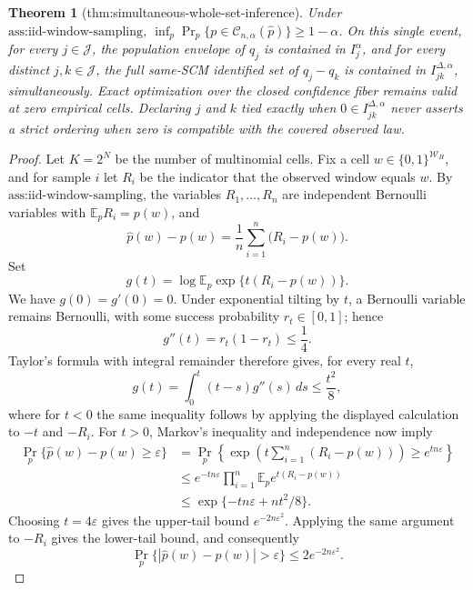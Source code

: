 \documentclass{article}
\newtheorem{theorem}{Theorem}
\begin{document}
\begin{theorem}[thm:simultaneous-whole-set-inference]\label{thm:simultaneous-whole-set-inference}
Under \(\text{ass:iid-window-sampling}\), \(\inf_p\Pr_p\{p\in\mathcal C_{n,\alpha}(\widehat p)\}\ge1-\alpha\). On this single event, for every \(j\in\mathcal J\), the population envelope of \(q_j\) is contained in \(I_j^{\alpha}\), and for every distinct \(j,k\in\mathcal J\), the full same-SCM identified set of \(q_j-q_k\) is contained in \(I_{jk}^{\Delta,\alpha}\), simultaneously. Exact optimization over the closed confidence fiber remains valid at zero empirical cells. Declaring \(j\) and \(k\) tied exactly when \(0\in I_{jk}^{\Delta,\alpha}\) never asserts a strict ordering when zero is compatible with the covered observed law.
\end{theorem}
\begin{proof}
Let \(K=2^N\) be the number of multinomial cells.  Fix a cell \(w\in\{0,1\}^{\mathcal W_H}\), and for sample \(i\) let \(R_i\) be the indicator that the observed window equals \(w\).  By \(\text{ass:iid-window-sampling}\), the variables \(R_1,\ldots,R_n\) are independent Bernoulli variables with \(\mathbb E_p R_i=p(w)\), and
\[
\widehat p(w)-p(w)=\frac1n\sum_{i=1}^n\bigl(R_i-p(w)\bigr).
\]
Set
\[
g(t)=\log\mathbb E_p\exp\{t(R_i-p(w))\}.
\]
We have \(g(0)=g'(0)=0\).  Under exponential tilting by \(t\), a Bernoulli variable remains Bernoulli, with some success probability \(r_t\in[0,1]\); hence
\[
g''(t)=r_t(1-r_t)\le\frac14.
\]
Taylor's formula with integral remainder therefore gives, for every real \(t\),
\[
g(t)=\int_0^t(t-s)g''(s)\,ds\le\frac{t^2}{8},
\]
where for \(t<0\) the same inequality follows by applying the displayed calculation to \(-t\) and \(-R_i\).  For \(t>0\), Markov's inequality and independence now imply
\[
\begin{aligned}
\Pr_p\{\widehat p(w)-p(w)\ge\varepsilon\}
&=\Pr_p\!\left\{\exp\!\left(t\sum_{i=1}^n(R_i-p(w))\right)
       \ge e^{tn\varepsilon}\right\}\\
&\le e^{-tn\varepsilon}\prod_{i=1}^n
       \mathbb E_p e^{t(R_i-p(w))}\\
&\le\exp\{-tn\varepsilon+nt^2/8\}.
\end{aligned}
\]
Choosing \(t=4\varepsilon\) gives the upper-tail bound \(e^{-2n\varepsilon^2}\).  Applying the same argument to \(-R_i\) gives the lower-tail bound, and consequently
\[
\Pr_p\{|\widehat p(w)-p(w)|>\varepsilon\}
\le 2e^{-2n\varepsilon^2}.
\tag{1}
\]


\end{proof}
\end{document}
